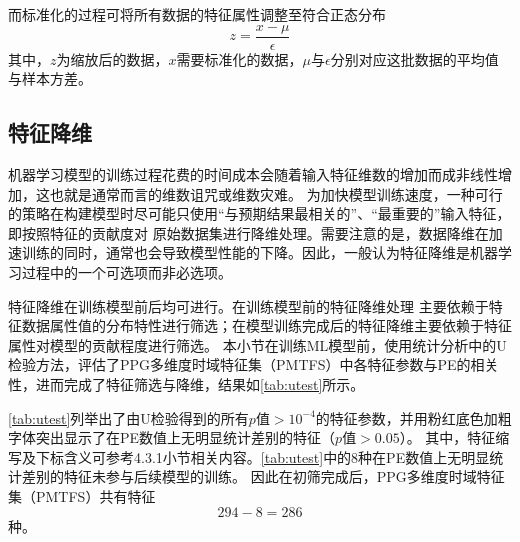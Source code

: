 而标准化的过程可将所有数据的特征属性调整至符合正态分布
\begin{equation}
    \label{equ:normalization}
    z = \frac{x - \mu}{\epsilon}
\end{equation}
其中，$z$为缩放后的数据，$x$需要标准化的数据，$\mu$与$\epsilon$分别对应这批数据的平均值与样本方差。

\subsection{特征降维}
机器学习模型的训练过程花费的时间成本会随着输入特征维数的增加而成非线性增加，这也就是通常而言的维数诅咒或维数灾难。
为加快模型训练速度，一种可行的策略在构建模型时尽可能只使用“与预期结果最相关的”、“最重要的”输入特征，即按照特征的贡献度对
原始数据集进行降维处理。需要注意的是，数据降维在加速训练的同时，通常也会导致模型性能的下降。因此，一般认为特征降维是机器学习过程中的一个可选项而非必选项。

特征降维在训练模型前后均可进行。在训练模型前的特征降维处理
主要依赖于特征数据属性值的分布特性进行筛选；在模型训练完成后的特征降维主要依赖于特征属性对模型的贡献程度进行筛选。
本小节在训练ML模型前，使用统计分析中的U检验方法，评估了PPG多维度时域特征集（PMTFS）中各特征参数与PE的相关性，进而完成了特征筛选与降维，结果如\autoref{tab:utest}所示。

\autoref{tab:utest}列举出了由U检验得到的所有$p$值$>10^{-4}$的特征参数，并用粉红底色加粗字体突出显示了在PE数值上无明显统计差别的特征（$p$值$> 0.05$）。
其中，特征缩写及下标含义可参考4.3.1小节相关内容。\autoref{tab:utest}中的8种在PE数值上无明显统计差别的特征未参与后续模型的训练。
因此在初筛完成后，PPG多维度时域特征集（PMTFS）共有特征
\begin{equation}
    \label{equ:fn2}
    294-8=286
\end{equation}
种。

